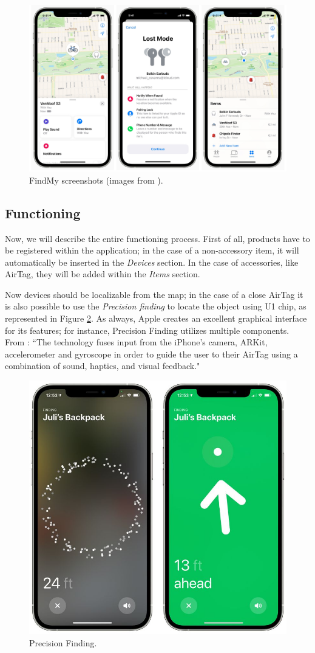 \documentclass[english]{article}
\begin{document}
\begin{figure}[t]
	\centering
	\includegraphics[width=.9\textwidth]{images/findmy.jpg}
	\caption{FindMy screenshots (images from \cite{findmyscreen}).}
	\label{findmy2}
\end{figure}

\subsection{Functioning}
Now, we will describe the entire functioning process. First of all, products have to be registered within the application; in the case of a non-accessory item, it will automatically be inserted in the \textit{Devices} section. In the case of accessories, like AirTag, they will be added within the \textit{Items} section.

Now devices should be localizable from the map; in the case of a close AirTag it is also possible to use the \textit{Precision finding} to locate the object using U1 chip, as represented in Figure \ref{findmy1}. As always, Apple creates an excellent graphical interface for its features; for instance, Precision Finding utilizes multiple components. From \cite{OBoyle_2021}: ``The technology fuses input from the iPhone's camera, ARKit, accelerometer and gyroscope in order to guide the user to their AirTag using a combination of sound, haptics, and visual feedback." 

\begin{figure}[t]
	\centering
	\includegraphics[width=.6\textwidth]{images/airtag-precision-finding-2.jpg}
	\caption{Precision Finding.}
	\label{findmy1}
\end{figure}
\end{document}
